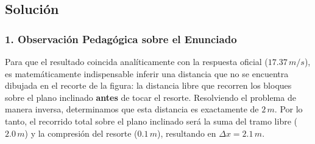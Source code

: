 \documentclass[12pt, a4paper]{article}
\begin{document}
\begin{center}
\end{center}

\subsection*{Solución}

\subsubsection*{1. Observación Pedagógica sobre el Enunciado}
Para que el resultado coincida analíticamente con la respuesta oficial ($17.37 \, \si{m/s}$), es matemáticamente indispensable inferir una distancia que no se encuentra dibujada en el recorte de la figura: la distancia libre que recorren los bloques sobre el plano inclinado \textbf{antes} de tocar el resorte. Resolviendo el problema de manera inversa, determinamos que esta distancia es exactamente de $2 \, \si{m}$. Por lo tanto, el recorrido total sobre el plano inclinado será la suma del tramo libre ($2.0 \, \si{m}$) y la compresión del resorte ($0.1 \, \si{m}$), resultando en $\Delta x = 2.1 \, \si{m}$.
\end{document}

